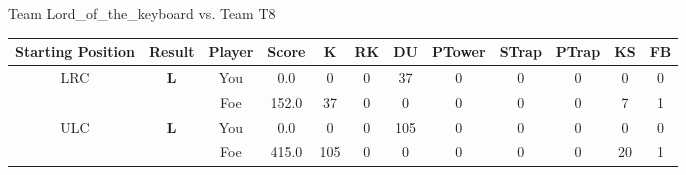 \documentclass[a4paper,12pt]{article}
\begin{document}
  \vspace*{2em}
  \par {\large {\color{Gray} Team} Lord\_of\_the\_keyboard {\color{Gray}
      vs. Team} T8}
  \newline
  \begin{tabular}[t]{| c | c | c | c | c | c | c | c | c | c | c | c
      |}
    \hline
    Starting Position & \textbf{Result} & Player & \textbf{Score} & K & RK & DU & PTower & STrap & PTrap & KS & FB \\
    
      
                      
      
                      
      
        \hline
        \multirow{2}{*}{  LRC
             } &
              \multirow{2}{*}{  \textbf{L}  } & 
                    \cellcolor{yellow!25} You & \cellcolor{yellow!25} 0.0 & \cellcolor{yellow!25} 0 &
                    \cellcolor{yellow!25} 0 & \cellcolor{yellow!25} 37 & \cellcolor{yellow!25} 0 &
                    \cellcolor{yellow!25} 0 & \cellcolor{yellow!25} 0 & \cellcolor{yellow!25} 0 &
                    \cellcolor{yellow!25} 0 \\
                    \cline{3-12}
                    & & \cellcolor{red!15} Foe & \cellcolor{red!15} 152.0 & \cellcolor{red!15} 37 & \cellcolor{red!15}
                    0 & \cellcolor{red!15} 0
                    & \cellcolor{red!15} 0 & \cellcolor{red!15}
                    0 & \cellcolor{red!15} 0 
                    & \cellcolor{red!15} 7 & \cellcolor{red!15}
                    1 \\
                    
                      
      
                      
      
                      
      
                      
      
                      
      
                      
      
                      
      
        \hline
        \multirow{2}{*}{  ULC  } &
              \multirow{2}{*}{  \textbf{L}  } & 
                    \cellcolor{yellow!25} You & \cellcolor{yellow!25} 0.0 & \cellcolor{yellow!25} 0 &
                    \cellcolor{yellow!25} 0 & \cellcolor{yellow!25} 105 & \cellcolor{yellow!25} 0 &
                    \cellcolor{yellow!25} 0 & \cellcolor{yellow!25} 0 & \cellcolor{yellow!25} 0 &
                    \cellcolor{yellow!25} 0 \\
                    \cline{3-12}
                    & & \cellcolor{red!15} Foe & \cellcolor{red!15} 415.0 & \cellcolor{red!15} 105 & \cellcolor{red!15}
                    0 & \cellcolor{red!15} 0
                    & \cellcolor{red!15} 0 & \cellcolor{red!15}
                    0 & \cellcolor{red!15} 0 
                    & \cellcolor{red!15} 20 & \cellcolor{red!15}
                    1 \\
                    

\end{tabular}
\end{document}
